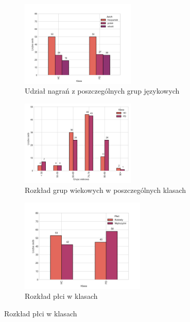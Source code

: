 \begin{figure}
    \begin{subfigure}{0.9\textwidth}
        \centering
       	\includegraphics[width=0.60\textwidth]{./img/database stats/languages_distribution}
	    \caption{Udział nagrań z poszczególnych grup językowych}
        \label{fig:language-distribution}
    \end{subfigure}

    \begin{subfigure}{0.85\textwidth}
        \centering
        \includegraphics[width=0.60\textwidth]{./img/database stats/age_distribution}
        \caption{Rozkład grup wiekowych w poszczególnych klasach}
        \label{fig:age-distribution}
    \end{subfigure}

    \begin{subfigure}{0.85\textwidth}
        \centering
       \includegraphics[width=0.65\textwidth]{./img/database stats/gender_distribution}
	    \caption{Rozkład płci w klasach}
        \label{fig:gender-distribution}
    \end{subfigure}


\end{figure}
